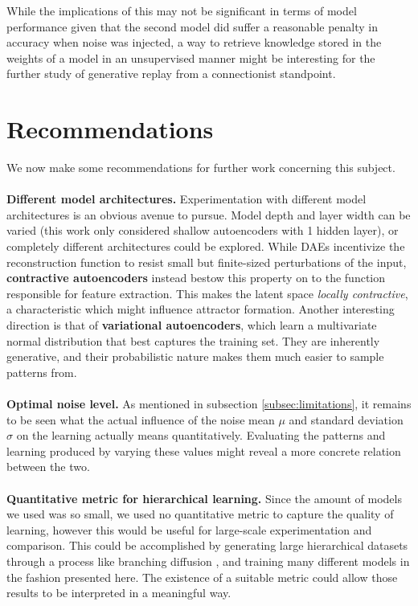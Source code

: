 \documentclass[11pt]{article}
\theoremstyle{remark}
\begin{document}
While the implications of this may not be significant in terms of model performance given that the second model did suffer a reasonable penalty in accuracy when noise was injected, a way to retrieve knowledge stored in the weights of a model in an unsupervised manner might be interesting for the further study of generative replay from a connectionist standpoint.

\section{Recommendations}

We now make some recommendations for further work concerning this subject.
\\
\\
\noindent \textbf{Different model architectures.} Experimentation with different model architectures is an obvious avenue to pursue. Model depth and layer width can be varied (this work only considered shallow autoencoders with 1 hidden layer), or completely different architectures could be explored. While DAEs incentivize the reconstruction function to resist small but finite-sized perturbations of the input, \textbf{contractive autoencoders} instead bestow this property on to the function responsible for feature extraction. This makes the latent space \textit{locally contractive}, a characteristic which might influence attractor formation. Another interesting direction is that of \textbf{variational autoencoders}, which learn a multivariate normal distribution that best captures the training set. They are inherently generative, and their probabilistic nature makes them much easier to sample patterns from.
\\
\\
\noindent \textbf{Optimal noise level.} As mentioned in subsection \ref{subsec:limitations}, it remains to be seen what the actual influence of the noise mean $\mu$ and standard deviation $\sigma$ on the learning actually means quantitatively. Evaluating the patterns and learning produced by varying these values might reveal a more concrete relation between the two.
\\
\\
\noindent \textbf{Quantitative metric for hierarchical learning.} Since the amount of models we used was so small, we used no quantitative metric to capture the quality of learning, however this would be useful for large-scale experimentation and comparison. This could be accomplished by generating large hierarchical datasets through a process like branching diffusion \cite{saxe2019a}, and training many different models in the fashion presented here. The existence of a suitable metric could allow those results to be interpreted in a meaningful way.
\end{document}
